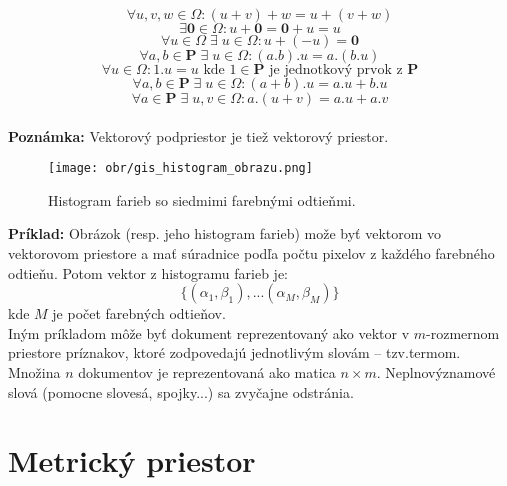 \documentclass[12pt,oneside]{fithesis2}
\begin{document}
\begin{equation*}
\forall u,v,w \in \Omega : (u + v)+w = u+(v+w) 
\end{equation*}
\begin{equation*}
\exists\mathbf{0} \in \Omega : u+\mathbf{0} = \mathbf{0}+u = u
\end{equation*}
\begin{equation*}
\forall u \in \Omega \; \exists \; u \in \Omega : u+(-u)  = \mathbf{0}
\end{equation*}
\begin{equation*}
\forall a,b \in \mathbf{P} \; \exists \; u \in \Omega : (a.b).u = a.(b.u) 
\end{equation*}
\begin{equation*}
\forall u \in \Omega : 1.u=u  \textrm{ kde } 1 \in \mathbf{P}  \textrm{ je jednotkový prvok z } \mathbf{P} 
\end{equation*}
\begin{equation*}
\forall a,b \in \mathbf{P} \; \exists \;u \in \Omega : (a+b).u = a.u + b.u 
\end{equation*}
\begin{equation*}
\forall a \in \mathbf{P} \; \exists \;u,v \in \Omega : a.(u+v) = a.u + a.v 
\end{equation*} \\
\textbf{Poznámka:} Vektorový podpriestor je tiež vektorový priestor.

\begin{figure}
  \centering
  \texttt{[image: obr/gis\_histogram\_obrazu.png]}
  \caption{Histogram farieb so siedmimi farebnými odtieňmi.}
  \label{fig:triangle}
\end{figure}  

\textbf{Príklad:}
Obrázok (resp. jeho histogram farieb) može byť vektorom vo vektorovom priestore a mať súradnice podľa počtu pixelov z každého farebného odtieňu.
Potom vektor z histogramu farieb je:
\begin{equation}
\{(\alpha_1,\beta_1),...(\alpha_M,\beta_M)\}
\end{equation}
kde $M$ je počet farebných odtieňov. \\
Iným príkladom môže byť dokument reprezentovaný ako
vektor v $m$-rozmernom priestore príznakov, ktoré zodpovedajú jednotlivým slovám – tzv.termom. Množina $n$ dokumentov je reprezentovaná ako matica $n\times m$. Neplnovýznamové slová (pomocne slovesá, spojky...) sa zvyčajne odstránia.


    \section{Metrický priestor}
    
\end{document}
